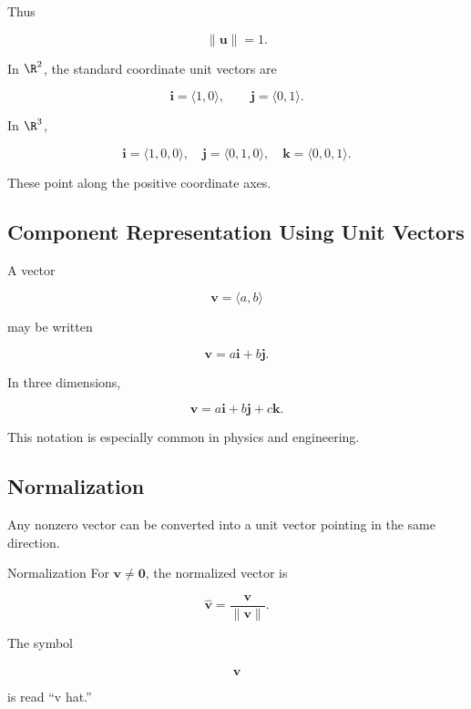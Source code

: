 Thus

\[ \|\mathbf{u}\|=1. \]

In \(\R^2\), the standard coordinate unit vectors are

\[ \boxed{\mathbf{i}=\langle1,0\rangle,\qquad\mathbf{j}=\langle0,1\rangle.} \]

In \(\R^3\),

\[
\boxed{
\mathbf{i}=\langle1,0,0\rangle,\quad
\mathbf{j}=\langle0,1,0\rangle,\quad
\mathbf{k}=\langle0,0,1\rangle.
}
\]

These point along the positive coordinate axes.

\subsection{Component Representation Using Unit Vectors}
\label{subsec:unit-vector-components}

A vector

\[ \mathbf{v}=\langle a,b\rangle \]

may be written

\[ \boxed{\mathbf{v}=a\mathbf{i}+b\mathbf{j}.} \]

In three dimensions,

\[ \boxed{\mathbf{v}=a\mathbf{i}+b\mathbf{j}+c\mathbf{k}.} \]

This notation is especially common in physics and engineering.

\subsection{Normalization}
\label{subsec:vector-normalization}

Any nonzero vector can be converted into a unit vector pointing in the same
direction.

\begin{definitionbox}{Normalization}
For \(\mathbf{v}\neq\mathbf{0}\), the normalized vector is

\[ \boxed{\widehat{\mathbf{v}}=\frac{\mathbf{v}}{\|\mathbf{v}\|}.} \]
\end{definitionbox}

The symbol

\[ \widehat{\mathbf{v}} \]

is read ``v hat.''

